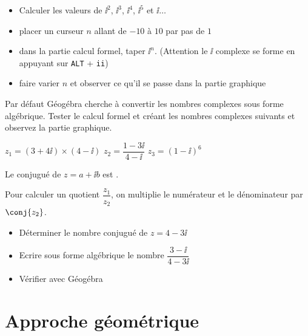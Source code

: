 \begin{exercice_cours}[Calcul de $\ii^n$]
	\begin{itemize}
		\item Calculer les valeurs de $\ii^2$, $\ii^3$, $\ii^4$, $\ii^5$ et $\ii\ldots$
			\item placer un curseur $n$ allant de $-10$ à $10$ par pas de $1$
			\item dans la partie calcul formel, taper $\ii^n$. (Attention le $\ii$ complexe se forme en appuyant sur \verb|ALT| + \verb|ii|)
			\item faire varier $n$ et observer ce qu'il se passe dans la partie graphique
	\end{itemize}
\end{exercice_cours}


\begin{exercice_cours}
	Par défaut Géogébra cherche à convertir les nombres complexes sous forme algébrique. Tester le calcul formel et créant les nombres complexes suivants et observez la partie graphique.

	$z_1 = (3+4\ii) \times (4-\ii)$ \hfill 
	$z_2=\dfrac{1-3\ii}{4-\ii}$ \hfill
	$z_3={(1-\ii)}^6$ \hfill
	\hspace{3cm}
\end{exercice_cours}


\begin{propriete}
	Le conjugué de $z=a+\ii b$ est .
\end{propriete}

\begin{methode}

	Pour calculer un quotient $\dfrac{z_1}{z_2}$, on multiplie le numérateur et le dénominateur par $\conj{z_2}$.
	\end{methode}
\begin{exercice_cours}[Application]
	\begin{itemize}
		\item Déterminer le nombre conjugué de $z=4-3\ii$
		\item Ecrire sous forme algébrique le nombre $\dfrac{3-\ii}{4-3\ii}$
		\item Vérifier avec Géogébra
	\end{itemize}
\end{exercice_cours}


\section{Approche géométrique}

